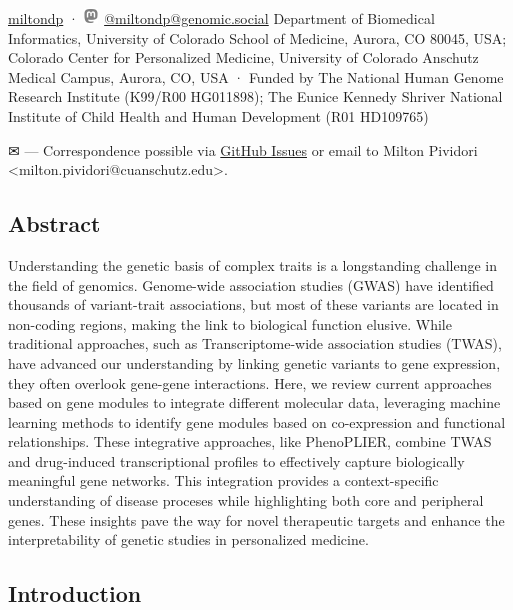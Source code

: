 \begin{itemize}
  \href{https://twitter.com/miltondp}{miltondp}
  · \includegraphics[width=0.16667in,height=0.16667in]{images/mastodon.svg}
  \href{https://genomic.social/@miltondp}{@miltondp@genomic.social}
  Department of Biomedical Informatics, University of Colorado School of Medicine, Aurora, CO 80045, USA; Colorado Center for Personalized Medicine, University of Colorado Anschutz Medical Campus, Aurora, CO, USA
  · Funded by The National Human Genome Research Institute (K99/R00 HG011898); The Eunice Kennedy Shriver National Institute of Child Health and Human Development (R01 HD109765)
\end{itemize}

\leavevmode{}%
✉ --- Correspondence possible via \href{https://github.com/pivlab/annual_review_of_biomedical_data_science/issues}{GitHub Issues}
or email to
Milton Pividori \textless milton.pividori@cuanschutz.edu\textgreater.

\hypertarget{abstract}{%
\subsection{Abstract}\label{abstract}}

Understanding the genetic basis of complex traits is a longstanding challenge in the field of genomics.
Genome-wide association studies (GWAS) have identified thousands of variant-trait associations, but most of these variants are located in non-coding regions, making the link to biological function elusive.
While traditional approaches, such as Transcriptome-wide association studies (TWAS), have advanced our understanding by linking genetic variants to gene expression, they often overlook gene-gene interactions.
Here, we review current approaches based on gene modules to integrate different molecular data, leveraging machine learning methods to identify gene modules based on co-expression and functional relationships.
These integrative approaches, like PhenoPLIER, combine TWAS and drug-induced transcriptional profiles to effectively capture biologically meaningful gene networks.
This integration provides a context-specific understanding of disease proceses while highlighting both core and peripheral genes.
These insights pave the way for novel therapeutic targets and enhance the interpretability of genetic studies in personalized medicine.

\hypertarget{introduction}{%
\subsection{Introduction}\label{introduction}}


